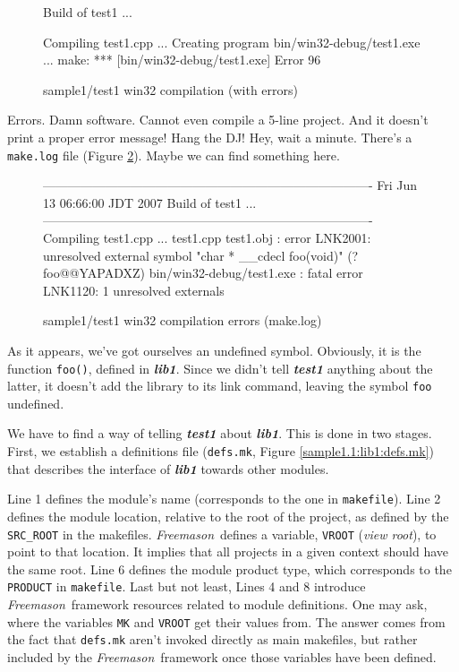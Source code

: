 \documentclass[a4paper]{article}
\newcommand{\freemason}{\textit{Freemason}}
\newcommand{\nameb}[1]{\textbf{\emph{#1}}}
\newcommand{\concept}[1]{\textit{#1}}
\begin{document}
\begin{figure}[h]
\caption{\label{sample1:test1:output.1}sample1/test1 win32 compilation (with errors)}
\begin{Code}
Build of test1 ...

Compiling test1.cpp ...
Creating program bin/win32-debug/test1.exe ...
make: *** [bin/win32-debug/test1.exe] Error 96
\end{Code}
\end{figure}

Errors. Damn software. Cannot even compile a 5-line project. And it doesn't print a proper error message! Hang the DJ!
Hey, wait a minute. There's a \verb"make.log" file (Figure \ref{sample1:test1:make.log.1}). Maybe we can find something here.
\begin{figure}[h]
\caption{\label{sample1:test1:make.log.1}sample1/test1 win32 compilation errors (make.log)}
\begin{Code}
-------------------------------------------------------------------------------
Fri Jun 13 06:66:00 JDT 2007
Build of test1 ...
-------------------------------------------------------------------------------
Compiling test1.cpp ...
test1.cpp
test1.obj : error LNK2001: unresolved external symbol
                           "char * __cdecl foo(void)" (?foo@@YAPADXZ)
bin/win32-debug/test1.exe : fatal error LNK1120: 1 unresolved externals
\end{Code}
\end{figure}

\par
As it appears, we've got ourselves an undefined symbol. Obviously, it is the function \verb"foo()", defined in \nameb{lib1}.
Since we didn't tell \nameb{test1} anything about the latter, it doesn't add the library to its link command, leaving the
symbol \verb"foo" undefined.

We have to find a way of telling \nameb{test1} about \nameb{lib1}. This is done in two stages.
First, we establish a definitions file (\verb"defs.mk", Figure \ref{sample1.1:lib1:defs.mk}) that describes
the interface of \nameb{lib1} towards other modules.
\par
Line 1 defines the module's name (corresponds to the one in \verb"makefile"). Line 2 defines the module location, relative to the
root of the project, as defined by the \verb"SRC_ROOT" in the makefiles. \freemason\ defines a variable, \verb"VROOT"
(\concept{view root}), to point to that location. It implies that all projects in a given context should have the
same root. Line 6 defines the module product type, which corresponds to the \verb"PRODUCT" in \verb"makefile".
Last but not least, Lines 4 and 8 introduce \freemason\ framework resources related to module definitions.
One may ask, where the variables \verb"MK" and \verb"VROOT" get their values from. The answer comes from the fact
that \verb"defs.mk" aren't invoked directly as main makefiles, but rather included by the \freemason\ framework
once those variables have been defined.
\end{document}
